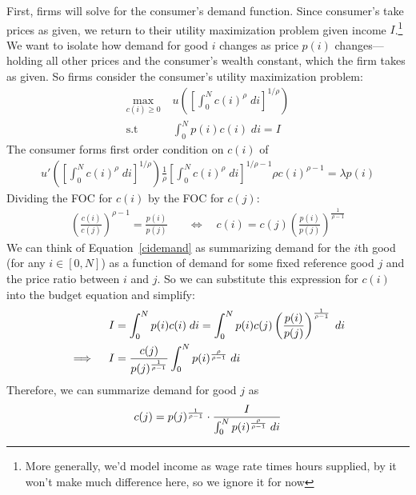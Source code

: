 \documentclass[12pt]{article}
\theoremstyle{plain}
\theoremstyle{definition}
\theoremstyle{remark}
\newcommand{\intzN}{\int_0^N}
\begin{document}
First, firms will solve for the consumer's demand function. Since
consumer's take prices as given, we return to their utility maximization
problem given income $I$.\footnote{%
  More generally, we'd model income as wage rate times hours supplied,
  by it won't make much difference here, so we ignore it for now
}
We want to isolate how demand for good $i$ changes as price $p(i)$
changes---holding all other prices and the consumer's wealth constant,
which the firm takes as given. So firms consider the consumer's utility
maximization problem:
\begin{align*}
  \max_{c(i) \geq 0}
    & \; u\left(
      \left[ \int_0^N c(i)^\rho \; di \right]^{1/\rho}
    \right)\\
  \text{s.t} & \;
    \intzN p(i) c(i) \; di= I
\end{align*}
The consumer forms first order condition on $c(i)$ of
\begin{align*}
  u'\left(
    \left[ \int_0^N c(i)^\rho \; di \right]^{1/\rho}
  \right)
  \frac{1}{\rho}
  \left[ \int_0^N c(i)^\rho \; di \right]^{1/\rho-1}
  \rho c(i)^{\rho-1}
  = \lambda p(i)
\end{align*}
Dividing the FOC for $c(i)$ by the FOC for $c(j)$:
\begin{align}
  \left(
  \frac{c(i)}{c(j)}
  \right)^{\rho-1}
  =
  \frac{p(i)}{p(j)}
  &\quad \iff \quad
  c(i)
  =
  c(j)
  \left(
  \frac{p(i)}{p(j)}
  \right)^{\frac{1}{\rho-1}}
  \label{cidemand}
\end{align}
We can think of Equation~\ref{cidemand} as summarizing demand for the
$i$th good (for any $i\in[0,N]$) as a function of demand for some fixed
reference good $j$ and the price ratio between $i$ and $j$.
So we can substitute this expression for $c(i)$ into the budget equation
and simplify:
\begin{align*}
  I &= \intzN p(i) c(i) \; di
  = \intzN p(i)
    c(j)
    \left(
    \frac{p(i)}{p(j)}
    \right)^{\frac{1}{\rho-1}} \notag
    \; di \\
  \implies\quad
  I
  &=
    \frac{c(j)}{p(j)^{\frac{1}{\rho-1}}}
    \intzN
    p(i)^{\frac{\rho}{\rho-1}} \notag
    \; di
\end{align*}
Therefore, we can summarize demand for good $j$ as
\begin{align*}
  c(j)
  =
  p(j)^{\frac{1}{\rho-1}}
  \cdot
  \frac{I}{\intzN p(i)^{\frac{\rho}{\rho-1}} \notag \; di}
\end{align*}
\end{document}
